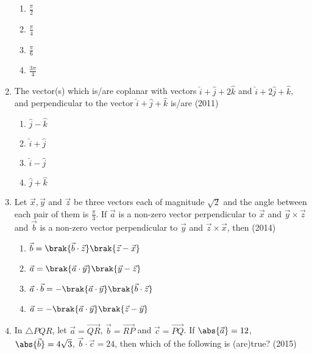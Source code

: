 \begin{enumerate}[label=\thesubsection.\arabic*.,ref=\thesubsection.\theenumi]
  \begin{multicols}{2}
		\begin{enumerate}
			\item $\frac{\pi}{2}$
			\item $\frac{\pi}{4}$
			\item $\frac{\pi}{6}$
			\item $\frac{3\pi}{4}$
		\end{enumerate}
  \end{multicols}
	\item The vector(s) which is/are coplanar with vectors $\hat{i}+\hat{j}+2\hat{k}$ and $\hat{i}+2\hat{j}+\hat{k}$, and perpendicular to the vector $\hat{i}+\hat{j}+\hat{k}$ is/are \hfill{(2011)}
  \begin{multicols}{2}
		\begin{enumerate}
			\item $\hat{j}-\hat{k}$
			\item $\hat{i}+\hat{j}$
			\item $\hat{i}-\hat{j}$
			\item $\hat{j}+\hat{k}$
		\end{enumerate}
  \end{multicols}
	\item Let $\vec{x},\vec{y}$ and $\vec{z}$ be three vectors each of magnitude $\sqrt{2}$ and the angle between each pair of them is $\frac{\pi}{3}$. If $\vec{a}$ is a non-zero vector perpendicular
		to $\vec{x}$ and $\vec{y}\times \vec{z}$ and $\vec{b}$ is a non-zero vector perpendicular to $\vec{y}$ and $\vec{z}\times \vec{x}$, then \hfill{(2014)}
  \begin{multicols}{2}
		\begin{enumerate}
			\item $\vec{b}=\brak{\vec{b} \cdot \vec{z}}\brak{\vec{z}-\vec{x}}$
			\item $\vec{a}=\brak{\vec{a} \cdot \vec{y}}\brak{\vec{y}-\vec{z}}$
			\item $\vec{a}\cdot\vec{b}=-\brak{\vec{a} \cdot \vec{y}}\brak{\vec{b}\cdot\vec{z}}$
			\item $\vec{a}=-\brak{\vec{a} \cdot \vec{y}}\brak{\vec{z}-\vec{y}}$
		\end{enumerate}
  \end{multicols}
	\item In $\triangle PQR$,  let $\vec{a}=\overrightarrow{QR}$, $\vec{b}=\overrightarrow{RP}$ and $\vec{c}=\overrightarrow{PQ}$. If $\abs{\vec{a}}=12$, $\abs{\vec{b}}=4\sqrt{3}$, $\vec{b}
		\cdot \vec{c}=24$, then which of the following is (are)true? \hfill{(2015)}

\end{enumerate}
